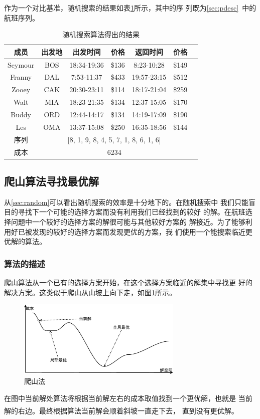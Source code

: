\documentclass[fontset=fandol,a4paper,zihao=5]{ctexart}
\newcommand{\upcite}[1]{\textsuperscript{\textsuperscript{\cite{#1}}}}
\begin{document}
			作为一个对比基准，随机搜索的结果如表\ref{tab:random}所示，其中的序
            列既为\ref{sec:pdesc}\ 中的航班序列。
			\begin{table}[!htbp]
				\centering
				\caption{随机搜索算法得出的结果}
				\label{tab:random}
				\begin{tabular}{ccccccc}
					\toprule[1pt]
					成员     & 出发地& 出发时间    &  价格  &  返回时间    &   价格 \\
					\midrule
					Seymour   &    BOS & 18:34-19:36 & \$136  & 8:23-10:28 & \$149 \\
					Franny    &   DAL  & 7:53-11:37 & \$433 & 19:57-23:15 & \$512 \\
					Zooey     &  CAK & 20:30-23:11 & \$114 & 18:17-21:04 & \$259 \\
					Walt      & MIA & 18:23-21:35 & \$134 & 12:37-15:05 & \$170 \\ 
					Buddy     &  ORD & 12:44-14:17 & \$134 & 14:19-17:09 & \$190 \\
					Les       & OMA & 13:37-15:08 & \$250 & 16:35-18:56 & \$144 \\
					\midrule
					序列    & \multicolumn{5}{c}{[8, 1, 9, 8, 4, 5, 7, 1, 8, 6, 1, 6]}\\
					成本    & \multicolumn{5}{c}{6234} \\
					\bottomrule[1pt]
				\end{tabular} 
			\end{table}
		\subsection{爬山算法寻找最优解}
			从\ref{sec:random}可以看出随机搜索的效率是十分地下的。在随机搜索中
            我们只能盲目的寻找下一个可能的选择方案而没有利用我们已经找到的较好
            的解。在航班选择问题中一个较好的选择方案的解很可能与其他较好方案的
            解接近。为了能够利用好已被发现的较好的选择方案而发现更优的方案，我
            们使用一个能搜索临近更优解的算法。
			\subsubsection{算法的描述}
			爬山算法从一个已有的选择方案开始，在这个选择方案临近的解集中寻找更
            好的解决方案。这类似于爬山从山坡上向下走，如图\ref{fig:around_search}所示。
			\begin{figure}[!h]
				\centering
				\includegraphics[width=0.7\textwidth]{pic/around_search.eps}
				\caption{\label{fig:around_search}爬山法}
			\end{figure}
			在图中当前解处算法将根据当前解左右的成本取值找到一个更优解，也就是
            当前解的右边。最终根据算法当前解会顺着斜坡一直走下去，
            直到没有更优解\upcite{Huhn2007Interior}。
			
\end{document}

